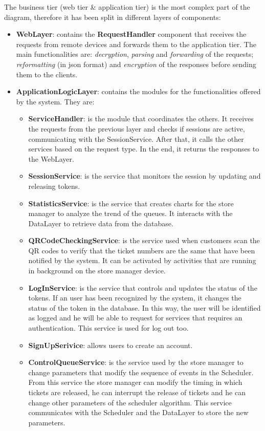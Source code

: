 The business tier (web tier \& application tier) is the most complex part of the diagram, therefore it has been split in different layers of components:
\begin{itemize}
    \item \textbf{WebLayer}: contains the \textbf{RequestHandler} component that receives the requests from remote devices and forwards them to the application tier. The main functionalities are: \textit{decryption}, \textit{parsing} and \textit{forwarding} of the requests; \textit{reformatting} (in \gls{json} format) and \textit{encryption} of the responses before sending them to the clients.

    \item \textbf{ApplicationLogicLayer}: contains the modules for the functionalities offered by the system. They are:
    \begin{itemize}
        \item \textbf{ServiceHandler}: is the module that coordinates the others. It receives the requests from the previous layer and checks if sessions are active, communicating with the SessionService. After that, it calls the other services based on the request type. In the end, it returns the responses to the WebLayer.
        \item \textbf{SessionService}: is the service that monitors the session by updating and releasing tokens.
        \item \textbf{StatisticsService}: is the service that creates charts for the store manager to analyze the trend of the queues. It interacts with the DataLayer to retrieve data from the database.
        \item \textbf{QRCodeCheckingService}: is the service used when customers scan the QR codes to verify that the ticket numbers are the same that have been notified by the system. It can be activated by activities that are running in background on the store manager device.
        \item \textbf{LogInService}: is the service that controls and updates the status of the tokens. If an user has been recognized by the system, it changes the status of the token in the database. In this way, the user will be identified as logged and he will be able to request for services that requires an authentication.
        This service is used for log out too.
        \item \textbf{SignUpSerivice}: allows users to create an account.
        \item \textbf{ControlQueueService}: is the service used by the store manager to change parameters that modify the sequence of events in the Scheduler. From this service the store manager can modify the timing in which tickets are released, he can interrupt the release of tickets and he can change other parameters of the scheduler algorithm. This service communicates with the Scheduler and the DataLayer to store the new parameters.

\end{itemize}
\end{itemize}
